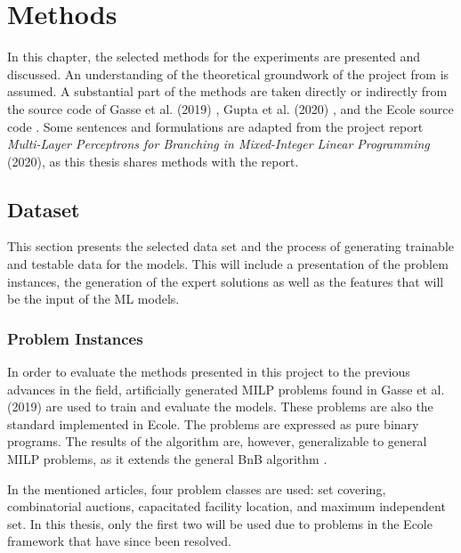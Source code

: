 \chapter{Methods}\label{cha:methods}

In this chapter, the selected methods for the experiments are presented and discussed.  
An understanding of the theoretical groundwork of the project from  is assumed. A substantial part of the methods are taken directly or indirectly from the source code of Gasse et al. (2019) \cite{gasse2019exact}, Gupta et al. (2020) \cite{gupta2020hybrid}, and the \gls{Ecole} source code \cite{prouvost2020ecole}. Some sentences and formulations are adapted from the project report \textit{Multi-Layer Perceptrons for Branching in Mixed-Integer Linear Programming} (2020), as this thesis shares methods with the report. 


\section{Dataset}\label{sec:dataset}

This section presents the selected data set and the process of generating trainable and testable data for the models. 
This will include a presentation of the problem instances, the generation of the expert solutions as well as the features that will be the input of the \gls{ML} models. 



\subsection{Problem Instances}\label{ssec:probleminstances}

In order to evaluate the methods presented in this project to the previous advances in the field, artificially generated \gls{MILP} problems found in Gasse et al. (2019) \cite{gasse2019exact} are used to train and evaluate the models. These problems are also the standard implemented in \gls{Ecole}.
The problems are expressed as pure binary programs. The results of the algorithm are, however, generalizable to general \gls{MILP} problems, as it extends the general \gls{BnB} algorithm \cite{gasse2019exact}. 

In the mentioned articles, four problem classes are used: set covering, combinatorial auctions, capacitated facility location, and maximum independent set. In this thesis, only the first two will be used due to problems in the \gls{Ecole} framework that have since been resolved. 

